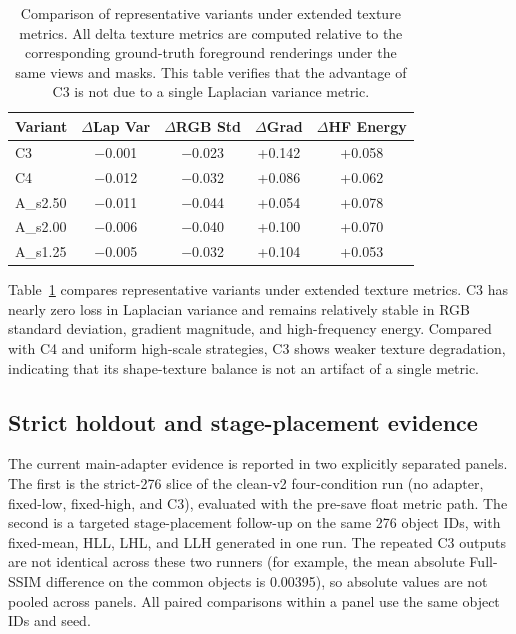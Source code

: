 \documentclass[times,twocolumn,final]{elsarticle}
\begin{document}
\begin{table}[h!]
\centering
\caption{Comparison of representative variants under extended texture metrics. All delta texture metrics are computed relative to the corresponding ground-truth foreground renderings under the same views and masks. This table verifies that the advantage of C3 is not due to a single Laplacian variance metric.}
\label{tab:extended}
\small
\begin{tabular}{lcccc}
\toprule
Variant & $\Delta$Lap Var & $\Delta$RGB Std & $\Delta$Grad & $\Delta$HF Energy \\
\midrule
C3 & $-$0.001 & $-$0.023 & +0.142 & +0.058 \\
C4 & $-$0.012 & $-$0.032 & +0.086 & +0.062 \\
A\_s2.50 & $-$0.011 & $-$0.044 & +0.054 & +0.078 \\
A\_s2.00 & $-$0.006 & $-$0.040 & +0.100 & +0.070 \\
A\_s1.25 & $-$0.005 & $-$0.032 & +0.104 & +0.053 \\
\bottomrule
\end{tabular}
\end{table}

Table~\ref{tab:extended} compares representative variants under extended texture metrics. C3 has nearly zero loss in Laplacian variance and remains relatively stable in RGB standard deviation, gradient magnitude, and high-frequency energy. Compared with C4 and uniform high-scale strategies, C3 shows weaker texture degradation, indicating that its shape-texture balance is not an artifact of a single metric.

\FloatBarrier

\fi
\subsection{Strict holdout and stage-placement evidence}
\label{subsec:largescale}

The current main-adapter evidence is reported in two explicitly separated
panels. The first is the strict-276 slice of the clean-v2 four-condition run
(no adapter, fixed-low, fixed-high, and C3), evaluated with the pre-save float
metric path. The second is a targeted stage-placement follow-up on the same
276 object IDs, with fixed-mean, HLL, LHL, and LLH generated in one run. The
repeated C3 outputs are not identical across these two runners (for example,
the mean absolute Full-SSIM difference on the common objects is 0.00395), so
absolute values are not pooled across panels. All paired comparisons within a
panel use the same object IDs and seed.
\end{document}
